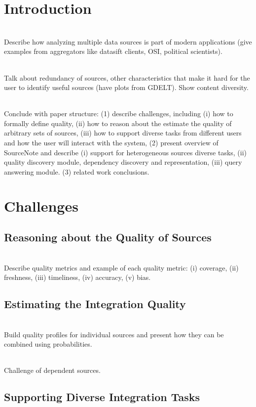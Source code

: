 \documentclass{sig-alternate}
\newcommand{\model}{{{\sf SourceNote}}\xspace}
\begin{document}
\section{Introduction}

\ \\Describe how analyzing multiple data sources is part of modern applications (give examples from aggregators like datasift clients, OSI, political scientists). 

\ \\Talk about redundancy of sources, other characteristics that make it hard for the user to identify useful sources (have plots from GDELT). Show content diversity.

\ \\Conclude with paper structure: (1) describe challenges, including (i) how to formally define quality, (ii) how to reason about the estimate the quality of arbitrary sets of sources, (iii) how to support diverse tasks from different users and how the user will interact with the system, (2) present overview of \model and describe (i) support for heterogeneous sources diverse tasks, (ii) quality discovery module, dependency discovery and representation, (iii) query answering module. (3) related work conclusions.

\section{Challenges}
\subsection{Reasoning about the Quality of Sources}

\ \\Describe quality metrics and example of each quality metric: (i) coverage, (ii) freshness, (iii) timeliness, (iv) accuracy, (v) bias. 

\subsection{Estimating the Integration Quality}

\ \\Build quality profiles for individual sources and present how they can be combined using probabilities. 

\ \\Challenge of dependent sources. 

\subsection{Supporting Diverse Integration Tasks}
\end{document}
